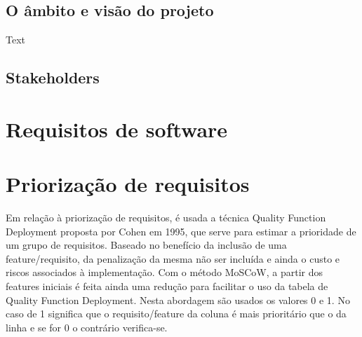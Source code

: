 \documentclass{scrreprt}
\begin{document}
\section{O âmbito e visão do projeto}

Text

\section{Stakeholders}

\chapter{Requisitos de software}

\chapter{Priorização de requisitos}

Em relação à priorização de requisitos, é usada a técnica Quality Function Deployment proposta por Cohen em 1995, que serve para estimar a prioridade de um grupo de requisitos. Baseado no benefício da inclusão de uma feature/requisito, da penalização da mesma não ser incluída e ainda o custo e riscos associados à implementação. Com o método MoSCoW, a partir dos features iniciais é feita ainda uma redução para facilitar o uso da tabela de Quality Function Deployment.
\newline
Nesta abordagem são usados os valores 0 e 1. No caso de 1 significa que o requisito/feature da coluna é mais prioritário que o da linha e se for 0 o contrário verifica-se.
\end{document}
